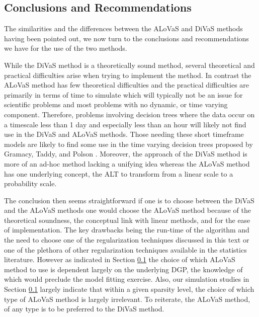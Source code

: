 \subsection{Conclusions and Recommendations}

The similarities and the differences between the ALoVaS and DiVaS methods having been pointed out, we now turn to the conclusions and recommendations we have for the use of the two methods. 

While the DiVaS method is a theoretically sound method, several theoretical and practical difficulties arise when trying to implement the method. In contrast the ALoVaS method has few theoretical difficulties and the practical difficulties are primarily in terms of time to simulate which will typically not be an issue for scientific problems and most problems with no dynamic, or time varying component. Therefore, problems involving decision trees where the data occur on a timescale less than 1 day and especially less than an hour will likely not find use in the DiVaS and ALoVaS methods. Those needing these short timeframe models are likely to find some use in the time varying decision trees proposed by Gramacy, Taddy, and Polson \cite{taddy2011dynamic}. Moreover, the approach of the DiVaS method is more of an ad-hoc method lacking a unifying idea whereas the ALoVaS method has one underlying concept, the ALT to transform from a linear scale to a probability scale. 

The conclusion then seems straightforward if one is to choose between the DiVaS and the ALoVaS methods one would choose the ALoVaS method because of the  theoretical soundness, the conceptual link with linear methods, and for the ease of implementation. The key drawbacks being the run-time of the algorithm and the need to choose one of the regularization techniques discussed in this text or one of the plethora of other regularization techniques available in the statistics literature. However as indicated in Section \ref{}  the choice of which ALoVaS method to use is dependent largely on the underlying DGP, the knowledge of which would preclude the model fitting exercise. Also, our simulation studies in Section \ref{} largely indicate that within a given sparsity level, the  choice of which type of ALoVaS method is largely irrelevant. To reiterate, the ALoVaS method, of any type is to be preferred to the DiVaS method. 

